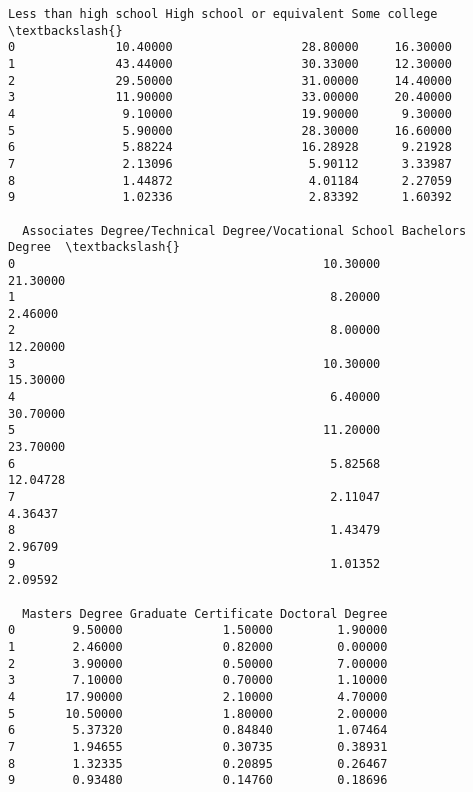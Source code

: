 \documentclass[11pt]{article}
\makeatletter
\newcommand{\boxspacing}{\kern\kvtcb@left@rule\kern\kvtcb@boxsep}
\newcommand{\prompt}[4]{
        \ttfamily\llap{{\color{#2}[#3]:\hspace{3pt}#4}}\vspace{-\baselineskip}
    }
\makeatother
\begin{document}
            \begin{tcolorbox}[breakable, size=fbox, boxrule=.5pt, pad at break*=1mm, opacityfill=0]
\prompt{Out}{outcolor}{45}{\boxspacing}
\begin{Verbatim}[commandchars=\\\{\}]
  Less than high school High school or equivalent Some college  \textbackslash{}
0              10.40000                  28.80000     16.30000
1              43.44000                  30.33000     12.30000
2              29.50000                  31.00000     14.40000
3              11.90000                  33.00000     20.40000
4               9.10000                  19.90000      9.30000
5               5.90000                  28.30000     16.60000
6               5.88224                  16.28928      9.21928
7               2.13096                   5.90112      3.33987
8               1.44872                   4.01184      2.27059
9               1.02336                   2.83392      1.60392

  Associates Degree/Technical Degree/Vocational School Bachelors Degree  \textbackslash{}
0                                           10.30000           21.30000
1                                            8.20000            2.46000
2                                            8.00000           12.20000
3                                           10.30000           15.30000
4                                            6.40000           30.70000
5                                           11.20000           23.70000
6                                            5.82568           12.04728
7                                            2.11047            4.36437
8                                            1.43479            2.96709
9                                            1.01352            2.09592

  Masters Degree Graduate Certificate Doctoral Degree
0        9.50000              1.50000         1.90000
1        2.46000              0.82000         0.00000
2        3.90000              0.50000         7.00000
3        7.10000              0.70000         1.10000
4       17.90000              2.10000         4.70000
5       10.50000              1.80000         2.00000
6        5.37320              0.84840         1.07464
7        1.94655              0.30735         0.38931
8        1.32335              0.20895         0.26467
9        0.93480              0.14760         0.18696
\end{Verbatim}
\end{tcolorbox}
        
\end{document}
